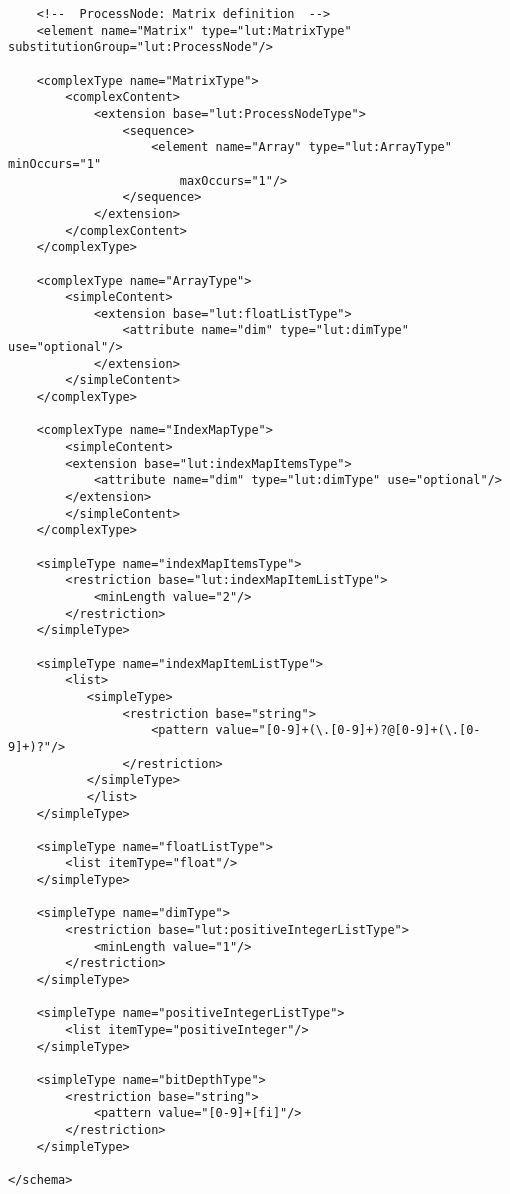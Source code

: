 \begin{lstlisting}
    <!--  ProcessNode: Matrix definition  -->
    <element name="Matrix" type="lut:MatrixType" substitutionGroup="lut:ProcessNode"/>

    <complexType name="MatrixType">
        <complexContent>
            <extension base="lut:ProcessNodeType">
                <sequence>
                    <element name="Array" type="lut:ArrayType" minOccurs="1" 
                        maxOccurs="1"/>
                </sequence>
            </extension>
        </complexContent>
    </complexType>

    <complexType name="ArrayType">
        <simpleContent>
            <extension base="lut:floatListType">
                <attribute name="dim" type="lut:dimType" use="optional"/>
            </extension>
        </simpleContent>
    </complexType>

    <complexType name="IndexMapType">
        <simpleContent>
        <extension base="lut:indexMapItemsType">
            <attribute name="dim" type="lut:dimType" use="optional"/>
        </extension>
        </simpleContent>
    </complexType>

    <simpleType name="indexMapItemsType">
        <restriction base="lut:indexMapItemListType">
            <minLength value="2"/>
        </restriction>
    </simpleType>

    <simpleType name="indexMapItemListType">
        <list>
           <simpleType>
                <restriction base="string">
                    <pattern value="[0-9]+(\.[0-9]+)?@[0-9]+(\.[0-9]+)?"/>
                </restriction>
           </simpleType>
           </list>
    </simpleType>

    <simpleType name="floatListType">
        <list itemType="float"/>
    </simpleType>

    <simpleType name="dimType">
        <restriction base="lut:positiveIntegerListType">
            <minLength value="1"/>
        </restriction>
    </simpleType>

    <simpleType name="positiveIntegerListType">
        <list itemType="positiveInteger"/>
    </simpleType>

    <simpleType name="bitDepthType">
        <restriction base="string">
            <pattern value="[0-9]+[fi]"/>
        </restriction>
    </simpleType>

</schema>
\end{lstlisting}

